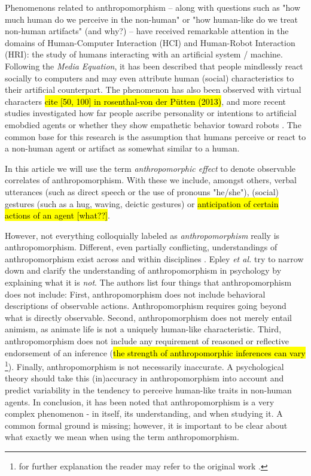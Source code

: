 \documentclass{frontiersSCNS} %
\begin{document}
	
Phenomenons related to anthropomorphism -- along with questions such as "how
much human do we perceive in the non-human" or "how human-like do we treat
non-human artifacts" (and why?) -- have received remarkable attention in the
domains of Human-Computer Interaction (HCI) and Human-Robot Interaction (HRI):
the study of humans interacting with an artificial system / machine. Following
the \textit{Media Equation}, it has been described that people mindlessly react
socially to computers \cite{reeves_media_1996} and may even attribute human
(social) characteristics to their artificial counterpart. The phenomenon has
also been observed with virtual characters \hl{cite [50, 100] in rosenthal-von
der P{\"u}tten (2013)}, and more recent studies investigated how far people
ascribe personality or intentions to artificial emobdied agents or whether they
show empathetic behavior toward robots
\cite{rosenthal-vonderputten_experimental_2013}. The common base for this
research is the assumption that humans perceive or react to a non-human agent or
artifact as somewhat similar to a human.

In this article we will use the term \emph{anthropomorphic effect} to denote
observable correlates of anthropomorphism. With these we include, amongst
others, verbal utterances (such as direct speech or the use of pronouns
"he/she"), (social) gestures (such as a hug, waving, deictic gestures) or
\hl{anticipation of certain actions of an agent [what??]}.


However, not everything colloquially labeled as \emph{anthropomorphism} really
is anthropomorphism. Different, even partially conflicting, understandings of
anthropomorphism exist across and within disciplines
\cite{duffy_anthropomorphism_2002}. Epley \textit{et al.} \cite{epley_when_2008}
try to narrow down and clarify the understanding of anthropomorphism in
psychology by explaining what it is \textit{not}. The authors list four things
that anthropomorphism does not include: First, anthropomorphism does not include
behavioral descriptions of observable actions. Anthropomorphism requires going
beyond what is directly observable. Second, anthropomorphism does not merely
entail animism, as animate life is not a uniquely human-like characteristic.
Third, anthropomorphism does not include any requirement of reasoned or
reflective endorsement of an inference (\hl{the strength of anthropomorphic
inferences can vary} \footnote{for further explanation the reader may refer to
the original work \cite{epley_when_2008}.}).	Finally, anthropomorphism is not
necessarily inaccurate. A psychological theory should take this (in)accuracy in
anthropomorphism into account and predict variability in the tendency to
perceive human-like traits in non-human agents.  In conclusion, it has been
noted that anthropomorphism is a very complex phenomenon - in itself, its
understanding, and when studying it. A common formal ground is missing; however,
it is important to be clear about what exactly we mean when using the term
anthropomorphism.
	 
\end{document}
